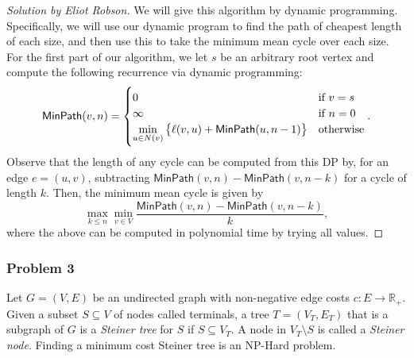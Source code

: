 \documentclass{article}
\newenvironment{solution}[1]{\begin{proof}[Solution by #1]}{\end{proof}}
\newcommand{\Reals}{\mathbb{R}}
\begin{document}
\begin{solution}{Eliot Robson}
	We will give this algorithm by dynamic programming. Specifically, we will use our dynamic program to find the path of cheapest length of each size, and then use this to take the minimum mean cycle over each size. For the first part of our algorithm, we let \(s\) be an arbitrary root vertex and compute the following recurrence via dynamic programming:
	\[
		\mathsf{MinPath}(v,n)
		=%
		\begin{cases}
            0 &\text{if } v = s\\
			\infty &\text{if } n = 0\\
			\min\limits_{u \in N(v)} \set{\ell(v,u) + \mathsf{MinPath}(u, n-1)} &\text{otherwise}
		\end{cases}.
	\]
	Observe that the length of any cycle can be computed from this DP by, for an edge \(e = (u,v)\), subtracting \(\mathsf{MinPath}(v, n) - \mathsf{MinPath}(v, n - k)\) for a cycle of length \(k\). Then, the minimum mean cycle is given by
    \[
        \max_{k \leq n} \min_{v \in V} \frac{\mathsf{MinPath}(v, n) - \mathsf{MinPath}(v, n - k)}{k},
    \]
    where the above can be computed in polynomial time by trying all values.
\end{solution}

\subsubsection{Problem 3}
Let \(G = (V,E)\) be an undirected graph with non-negative edge costs \(c : E \to \Reals_{+}\). Given a subset \(S \subseteq V\) of nodes called terminals, a tree \(T = (V_T, E_T)\) that is a subgraph of \(G\) is a \emph{Steiner tree} for \(S\) if \(S \subseteq V_T\). A node in \(V_T \setminus S\) is called a \textit{Steiner node}. Finding a minimum cost Steiner tree is an NP-Hard problem.
\end{document}

